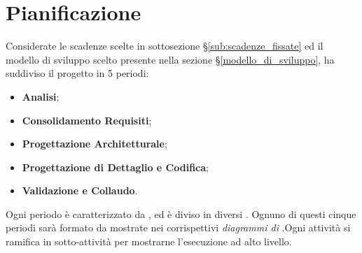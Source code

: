 \section{Pianificazione}
\label{pianificazione}
Considerate le scadenze scelte in sottosezione \S\ref{sub:scadenze_fissate} ed il modello di sviluppo scelto presente nella sezione \S\ref{modello_di_sviluppo}, {\Gruppo} ha suddiviso il progetto in 5 periodi:
\begin{itemize}
    \item \textbf{Analisi};
    \item \textbf{Consolidamento Requisiti};
    \item \textbf{Progettazione Architetturale};
    \item \textbf{Progettazione di Dettaglio e Codifica};
    \item \textbf{Validazione e Collaudo}.
\end{itemize}
 Ogni periodo è caratterizzato da ,  ed è diviso in diversi . Ognuno di questi cinque periodi sarà formato da  mostrate nei corrispettivi \textit{diagrammi di }.Ogni attività si ramifica in sotto-attività per mostrarne l'esecuzione ad alto livello.


\newpage

\newpage

\newpage

\newpage

\newpage
